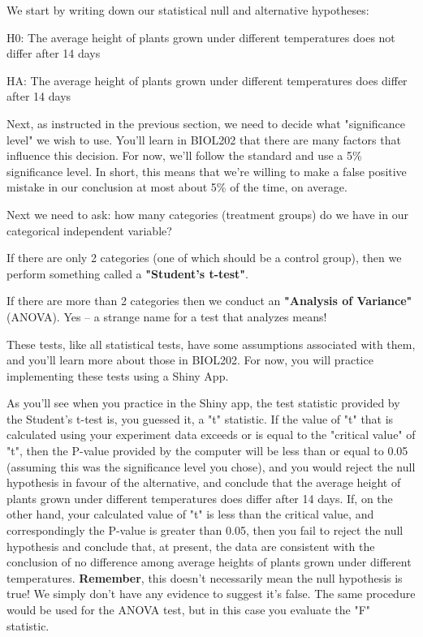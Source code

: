 \documentclass[
]{book}
\begin{document}
We start by writing down our statistical null and alternative hypotheses:

H0: The average height of plants grown under different temperatures does not differ after 14 days

HA: The average height of plants grown under different temperatures does differ after 14 days

Next, as instructed in the previous section, we need to decide what "significance level" we wish to use. You'll learn in BIOL202 that there are many factors that influence this decision. For now, we'll follow the standard and use a 5\% significance level. In short, this means that we're willing to make a false positive mistake in our conclusion at most about 5\% of the time, on average.

Next we need to ask: how many categories (treatment groups) do we have in our categorical independent variable?

If there are only 2 categories (one of which should be a control group), then we perform something called a \textbf{"Student's t-test"}.

If there are more than 2 categories then we conduct an \textbf{"Analysis of Variance"} (ANOVA). Yes -- a strange name for a test that analyzes means!

These tests, like all statistical tests, have some assumptions associated with them, and you'll learn more about those in BIOL202. For now, you will practice implementing these tests using a Shiny App.

As you'll see when you practice in the Shiny app, the test statistic provided by the Student's t-test is, you guessed it, a "t" statistic. If the value of "t" that is calculated using your experiment data exceeds or is equal to the "critical value" of "t", then the P-value provided by the computer will be less than or equal to 0.05 (assuming this was the significance level you chose), and you would reject the null hypothesis in favour of the alternative, and conclude that the average height of plants grown under different temperatures does differ after 14 days. If, on the other hand, your calculated value of "t" is less than the critical value, and correspondingly the P-value is greater than 0.05, then you fail to reject the null hypothesis and conclude that, at present, the data are consistent with the conclusion of no difference among average heights of plants grown under different temperatures. \textbf{Remember}, this doesn't necessarily mean the null hypothesis is true! We simply don't have any evidence to suggest it's false.
The same procedure would be used for the ANOVA test, but in this case you evaluate the "F" statistic.
\end{document}

